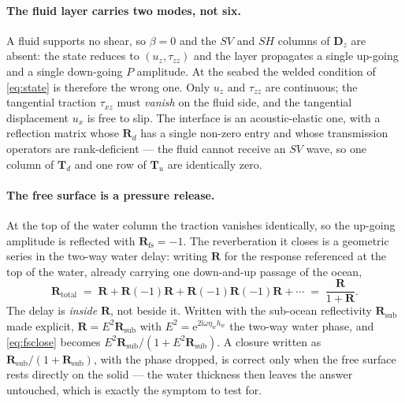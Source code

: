 \documentclass[11pt,a4paper]{article}
\newcommand{\ii}{\mathrm{i}}
\newcommand{\bD}{\mathbf{D}}
\newcommand{\bR}{\mathbf{R}}
\newcommand{\bT}{\mathbf{T}}
\begin{document}
\paragraph{The fluid layer carries two modes, not six.} A fluid supports no
shear, so $\beta=0$ and the $SV$ and $SH$ columns of $\bD_z$ are absent: the
state reduces to $(u_z,\tau_{zz})$ and the layer propagates a single up-going
and a single down-going $P$ amplitude. At the seabed the welded condition of
\eqref{eq:state} is therefore the wrong one. Only $u_z$ and $\tau_{zz}$ are
continuous; the tangential traction $\tau_{xz}$ must \emph{vanish} on the fluid
side, and the tangential displacement $u_x$ is free to slip. The interface is an
acoustic-elastic one, with a reflection matrix whose $\bR_d$ has a single
non-zero entry and whose transmission operators are rank-deficient --- the fluid
cannot receive an $SV$ wave, so one column of $\bT_d$ and one row of $\bT_u$ are
identically zero.

\paragraph{The free surface is a pressure release.} At the top of the water
column the traction vanishes identically, so the up-going amplitude is reflected
with $\bR_{\mathrm{fs}}=-1$. The reverberation it closes is a geometric series
in the two-way water delay: writing $\bR$ for the response referenced at the top
of the water, already carrying one down-and-up passage of the ocean,
\begin{equation}\label{eq:fsclose}
  \bR_{\text{total}}
  \;=\;\bR+\bR(-1)\bR+\bR(-1)\bR(-1)\bR+\cdots
  \;=\;\frac{\bR}{1+\bR}.
\end{equation}
The delay is \emph{inside} $\bR$, not beside it. Written with the sub-ocean
reflectivity $\bR_{\text{sub}}$ made explicit, $\bR=E^{2}\bR_{\text{sub}}$ with
$E^{2}=\mathrm{e}^{2\ii\omega\eta_w h_w}$ the two-way water phase, and
\eqref{eq:fsclose} becomes $E^{2}\bR_{\text{sub}}/(1+E^{2}\bR_{\text{sub}})$. A
closure written as $\bR_{\text{sub}}/(1+\bR_{\text{sub}})$, with the phase
dropped, is correct only when the free surface rests directly on the solid ---
the water thickness then leaves the answer untouched, which is exactly the
symptom to test for.
\end{document}
